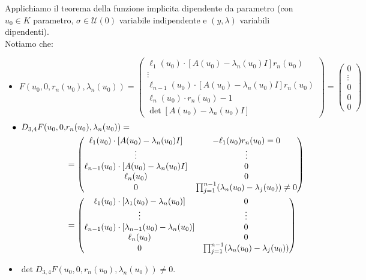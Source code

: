 Applichiamo il teorema della funzione implicita dipendente da parametro (con $u_{0}\in K$ parametro, $\sigma\in\mathcal{U}(0)$ variabile indipendente e $(y,\lambda)$ variabili dipendenti).\\
Notiamo che:
\begin{itemize}
    \item $F(u_{0},0,r_{n}(u_{0}),\lambda_{n}(u_{0})) = 
    \begin{pmatrix}
    \ell_{1}(u_{0})\cdot[A(u_{0})-\lambda_{n}(u_{0}) I]r_{n}(u_{0})\\
    \vdots \\
    \ell_{n-1}(u_{0})\cdot[A(u_{0})-\lambda_{n}(u_{0}) I]r_{n}(u_{0})\\
    \ell_{n}(u_{0})\cdot r_{n}(u_{0})-1\\
    \det[A(u_{0})-\lambda_{n}(u_{0}) I]
    \end{pmatrix}
    = 
    \begin{pmatrix}
        0\\
        \vdots\\
        0\\
        0\\
        0
    \end{pmatrix}
    $
    \begin{align*}
    \hspace{-0.40cm}\bullet\hspace{0.20cm} D_{3,4}F(u_{0},0,&r_{n}(u_{0}),\lambda_{n}(u_{0}))=\\
    &=\begin{pmatrix}
    \ell_{1}(u_{0})\cdot[A(u_{0})-\lambda_{n}(u_{0}) I] & -\ell_{1}(u_{0})r_{n}(u_{0})=0\\
    \vdots & \vdots\\
    \ell_{n-1}(u_{0})\cdot[A(u_{0})-\lambda_{n}(u_{0}) I] & 0\\
    \ell_{n}(u_{0}) & 0\\
    0 & \prod_{j=1}^{n-1}(\lambda_{n}(u_{0})-\lambda_{j}(u_{0}))\neq 0
    \end{pmatrix}\\
    &=
    \begin{pmatrix}
    \ell_{1}(u_{0})\cdot[\lambda_{1}(u_{0})-\lambda_{n}(u_{0})] & 0\\
    \vdots & \vdots\\
    \ell_{n-1}(u_{0})\cdot[\lambda_{n-1}(u_{0})-\lambda_{n}(u_{0})] & 0\\
    \ell_{n}(u_{0}) & 0\\
    0 & \prod_{j=1}^{n-1}(\lambda_{n}(u_{0})-\lambda_{j}(u_{0}))
    \end{pmatrix}\\
    \end{align*}
    \item $\det D_{3,4}F(u_{0},0,r_{n}(u_{0}),\lambda_{n}(u_{0}))\neq 0$.
\end{itemize} 
